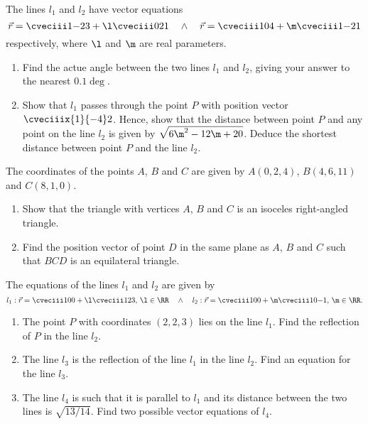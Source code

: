 \begin{problem}
    The lines $l_1$ and $l_2$ have vector equations \[\vec r = \cveciii1{-2}3 + \l \cveciii021 \quad \land \quad \vec r = \cveciii104 + \m \cveciii1{-2}1\] respectively, where $\l$ and $\m$ are real parameters.

    \begin{enumerate}
        \item Find the actue angle between the two lines $l_1$ and $l_2$, giving your answer to the nearest $0.1\deg$.
        \item Show that $l_1$ passes through the point $P$ with position vector $\cveciiix{1}{-4}2$. Hence, show that the distance between point $P$ and any point on the line $l_2$ is given by $\sqrt{6\m^2 - 12\m + 20}$. Deduce the shortest distance between point $P$ and the line $l_2$.
    \end{enumerate}
\end{problem}

\begin{problem}[\chili]
    The coordinates of the points $A$, $B$ and $C$ are given by $A(0, 2, 4)$, $B(4, 6, 11)$ and $C(8, 1, 0)$.
    
    \begin{enumerate}
        \item Show that the triangle with vertices $A$, $B$ and $C$ is an isoceles right-angled triangle.
        \item Find the position vector of point $D$ in the same plane as $A$, $B$ and $C$ such that $BCD$ is an equilateral triangle.
    \end{enumerate}
\end{problem}

\begin{problem}[\chili]
    The equations of the lines $l_1$ and $l_2$ are given by \[l_1: \vec r = \cveciii100 + \l \cveciii123, \, \l \in \RR \quad \land \quad l_2: \vec r = \cveciii100 + \m \cveciii10{-1}, \, \m \in \RR.\]

    \begin{enumerate}
        \item The point $P$ with coordinates $(2, 2, 3)$ lies on the line $l_1$. Find the reflection of $P$ in the line $l_2$.
        \item The line $l_3$ is the reflection of the line $l_1$ in the line $l_2$. Find an equation for the line $l_3$.
        \item The line $l_4$ is such that it is parallel to $l_1$ and its distance between the two lines is $\sqrt{13/14}$. Find two possible vector equations of $l_4$.
    \end{enumerate}
\end{problem}